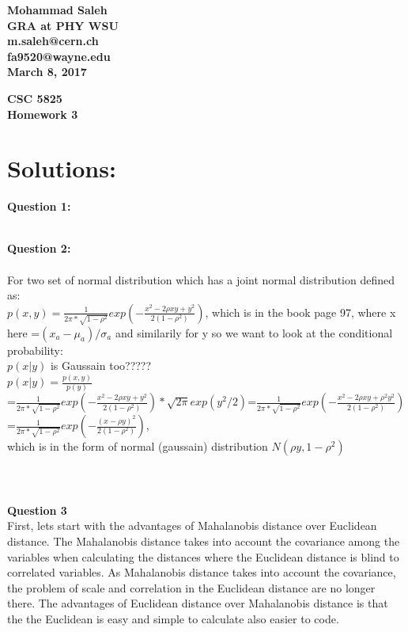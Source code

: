 \documentclass{article}
\begin{document}

\begin{flushright}
\textbf{Mohammad Saleh\\
GRA at PHY WSU\\
m.saleh@cern.ch\\ fa9520@wayne.edu\\
March 8, 2017}
\end{flushright}

\begin{center}
\textbf{CSC 5825 \\
Homework  3} \\
\end{center}

\section*{Solutions:}
\textbf{Question 1:}
\newline

\\
\textbf{Question 2:}
\\
\\
For two set of normal distribution which has a joint normal distribution defined as:\\
$p(x,y)=\frac{1}{2\pi*\sqrt{1-\rho^{2}}}exp(-\frac{x^{2}-2\rho{}xy+y^{2}}{2(1-\rho^{2})})$, which is in the book page 97, where x here =$(x_{a}-\mu_{a})/\sigma_{a}$ and similarily for y
so we want to look at the conditional probability:\\
$p(x|y)$ is Gaussain too?????\\
$p(x|y)=\frac{p(x,y)}{p(y)}$\\
=$\frac{1}{2\pi*\sqrt{1-\rho^{2}}}exp(-\frac{x^{2}-2\rho{}xy+y^{2}}{2(1-\rho^{2})})*\sqrt{2\pi}exp(y^{2}/2)$=$\frac{1}{2\pi*\sqrt{1-\rho^{2}}}exp(-\frac{x^{2}-2\rho{}xy+\rho^{2}y^{2}}{2(1-\rho^{2})})$\\
=$\frac{1}{2\pi*\sqrt{1-\rho^{2}}}exp(-\frac{(x-\rho{}y)^2}{2(1-\rho^{2})})$,\\
which is in the form of normal (gaussain) distribution $N(\rho{}y,1-\rho^2)$
\\
\\
\\
\\
\textbf{Question 3}
\\
First, lets start with the advantages of Mahalanobis distance over Euclidean distance. The Mahalanobis distance takes into account the covariance among the variables when calculating the distances where the Euclidean distance is blind to correlated variables. As Mahalanobis distance takes into account the covariance, the problem of scale and correlation  in the Euclidean distance are no longer there. The advantages of Euclidean distance over Mahalanobis distance is that the the Euclidean is easy and simple to calculate also easier to code.
\end{document}
